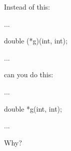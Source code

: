 Instead of this:



\begin{consolethree}[escapeinside=||]

...

double (*g)(int, int);

...

\end{consolethree}



can you do this:



\begin{consolethree}[escapeinside=||]

...

double *g(int, int);

...

\end{consolethree}



Why?


